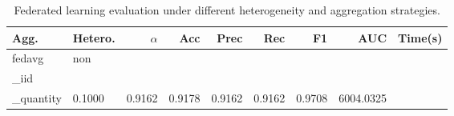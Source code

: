 \begin{table}[t]
\centering
\caption{Federated learning evaluation under different heterogeneity and aggregation strategies.}\n\label{tab:phase2_federated_results}\n\begin{tabular}{l l r r r r r r r}\n\hline
Agg. & Hetero. & $\alpha$ & Acc & Prec & Rec & F1 & AUC & Time(s) \\ \hline
fedavg & non\\_iid\\_quantity & 0.1000 & 0.9162 & 0.9178 & 0.9162 & 0.9162 & 0.9708 & 6004.0325 \\ 
\hline
\end{tabular}
\end{table}

